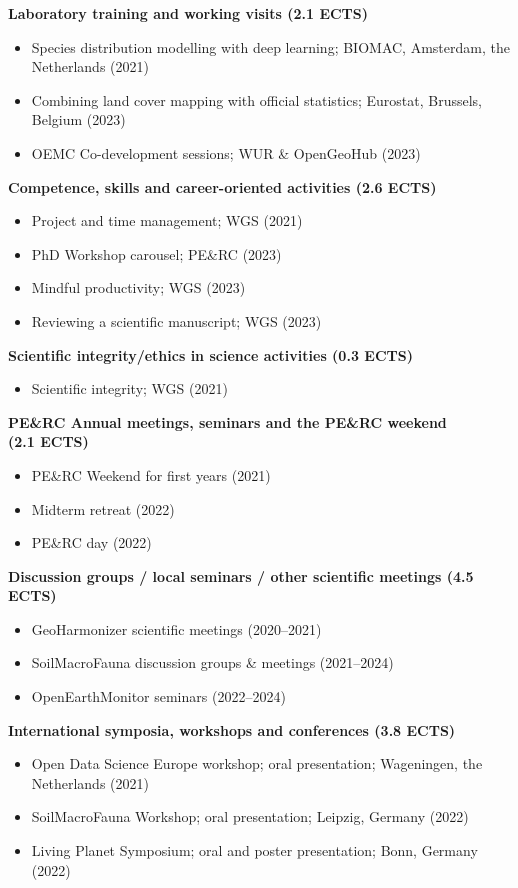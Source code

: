 \textbf{Laboratory training and working visits (2.1 ECTS)}
\begin{itemize}[nolistsep]
    \item Species distribution modelling with deep learning; BIOMAC, Amsterdam, the Netherlands (2021)
    \item Combining land cover mapping with official statistics; Eurostat, Brussels, Belgium (2023)
    \item OEMC Co-development sessions; WUR \& OpenGeoHub (2023)
\end{itemize}

\textbf{Competence, skills and career-oriented activities (2.6 ECTS)}
\begin{itemize}[nolistsep]
    \item Project and time management; WGS (2021)
    \item PhD Workshop carousel; PE\&RC (2023)
    \item Mindful productivity; WGS (2023)
    \item Reviewing a scientific manuscript; WGS (2023)
\end{itemize}

\textbf{Scientific integrity/ethics in science activities (0.3 ECTS)}
\begin{itemize}[nolistsep]
    \item Scientific integrity; WGS (2021)
\end{itemize}

\textbf{PE\&RC Annual meetings, seminars and the PE\&RC weekend \\ (2.1 ECTS)}
\begin{itemize}[nolistsep]
    \item PE\&RC Weekend for first years (2021)
    \item Midterm retreat (2022)
    \item PE\&RC day (2022)
\end{itemize}

\textbf{Discussion groups / local seminars / other scientific meetings (4.5 ECTS)}
\begin{itemize}[nolistsep]
    \item GeoHarmonizer scientific meetings (2020--2021)
    \item SoilMacroFauna discussion groups \& meetings (2021--2024)
    \item OpenEarthMonitor seminars (2022--2024)
\end{itemize}

\textbf{International symposia, workshops and conferences (3.8 ECTS)}
\begin{itemize}[nolistsep]
    \item Open Data Science Europe workshop; oral presentation; Wageningen, the Netherlands (2021)
    \item SoilMacroFauna Workshop; oral presentation; Leipzig, Germany (2022)
    \item Living Planet Symposium; oral and poster presentation; Bonn, Germany (2022)
\end{itemize}

